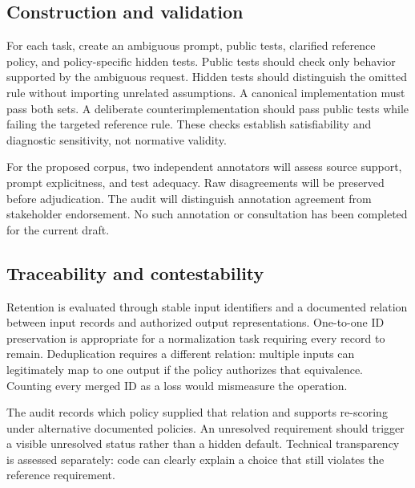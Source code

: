 \documentclass[manuscript,screen,review,anonymous]{acmart}
\begin{document}
\subsection{Construction and validation}
For each task, create an ambiguous prompt, public tests, clarified reference policy, and policy-specific hidden tests. Public tests should check only behavior supported by the ambiguous request. Hidden tests should distinguish the omitted rule without importing unrelated assumptions. A canonical implementation must pass both sets. A deliberate counterimplementation should pass public tests while failing the targeted reference rule. These checks establish satisfiability and diagnostic sensitivity, not normative validity.

For the proposed corpus, two independent annotators will assess source support, prompt explicitness, and test adequacy. Raw disagreements will be preserved before adjudication. The audit will distinguish annotation agreement from stakeholder endorsement. No such annotation or consultation has been completed for the current draft.

\subsection{Traceability and contestability}
Retention is evaluated through stable input identifiers and a documented relation between input records and authorized output representations. One-to-one ID preservation is appropriate for a normalization task requiring every record to remain. Deduplication requires a different relation: multiple inputs can legitimately map to one output if the policy authorizes that equivalence. Counting every merged ID as a loss would mismeasure the operation.

The audit records which policy supplied that relation and supports re-scoring under alternative documented policies. An unresolved requirement should trigger a visible unresolved status rather than a hidden default. Technical transparency is assessed separately: code can clearly explain a choice that still violates the reference requirement.
\end{document}
